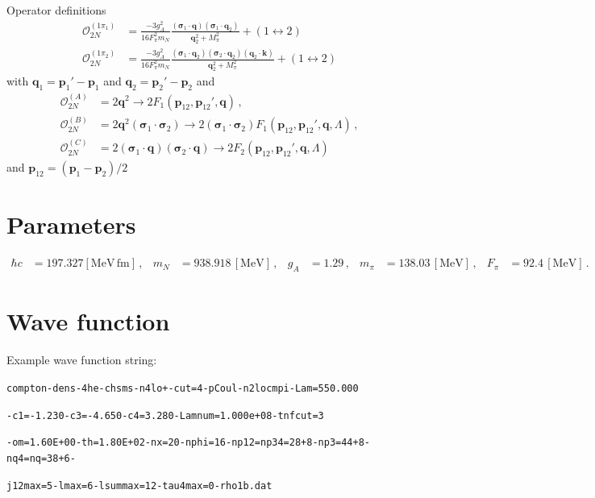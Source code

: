 \documentclass[onecolumn]{revtex4-2}
\renewcommand{\vec}[1]{\boldsymbol{#1}}
\begin{document}
Operator definitions
\begin{align}
    \mathcal{O}_{2N}^{(1\pi_1)}
    &=
    \frac{-3 g_A^2}{16 F_\pi^2 m_N}
    \frac{(\vec \sigma_1 \cdot \vec q)(\vec \sigma_1 \cdot \vec q_2)}{\vec q_2^2 + M_\pi^2}
    + (1 \leftrightarrow 2)
    \,\\
    \mathcal{O}_{2N}^{(1\pi_2)}
    &=
    \frac{-3 g_A^2}{16 F_\pi^2 m_N}
    \frac{(\vec \sigma_1 \cdot \vec q_2)(\vec \sigma_2 \cdot \vec q_2)(\vec q_2 \cdot \vec k)}{\vec q_2^2 + M_\pi^2}
    + (1 \leftrightarrow 2)
\end{align}
with $\vec q_1 = \vec p_1' - \vec p_1$ and $\vec q_2 = \vec p_2' - \vec p_2$ and
\begin{align}
    \mathcal{O}_{2N}^{(A)}
    &=
    2 \vec q^2 \to 2 F_1(\vec p_{12}, \vec p_{12}', \vec q)
    \, , \\
    \mathcal{O}_{2N}^{(B)}
    &=
    2 \vec q^2 (\vec \sigma_1 \cdot \vec \sigma_2) \to 2 (\vec \sigma_1 \cdot \vec \sigma_2) F_1(\vec p_{12}, \vec p_{12}', \vec q, \Lambda)
    \, , \\
    \mathcal{O}_{2N}^{(C)}
    &=
    2 (\vec \sigma_1 \cdot \vec q)(\vec \sigma_2 \cdot \vec q) \to 2 F_2(\vec p_{12}, \vec p_{12}', \vec q, \Lambda)
\end{align}
and $\vec p_{12} = (\vec p_1 - \vec p_2)/2$

\section{Parameters}
\begin{align}
    \hbar c &= 197.327 [\mathrm{MeV} \, \mathrm{fm}]\, , &
    m_N &= 938.918 \, [\mathrm{MeV}] \, , &
    g_A &= 1.29 \, , &
    m_\pi &= 138.03 \, [\mathrm{MeV}] \, , &
    F_\pi &= 92.4 \, [\mathrm{MeV}] \, .
\end{align}

\section{Wave function}

Example wave function string:

\texttt{compton-dens-4he-chsms-n4lo+-cut=4-pCoul-n2locmpi-Lam=550.000}

\texttt{-c1=-1.230-c3=-4.650-c4=3.280-Lamnum=1.000e+08-tnfcut=3}

\texttt{-om=1.60E+00-th=1.80E+02-nx=20-nphi=16-np12=np34=28+8-np3=44+8-nq4=nq=38+6-}

\texttt{j12max=5-lmax=6-lsummax=12-tau4max=0-rho1b.dat}
\end{document}
